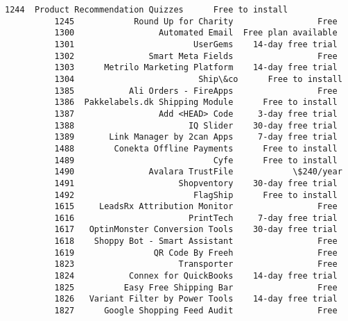 \documentclass[11pt]{article}
\begin{document}
\begin{Verbatim}[commandchars=\\\{\}]
          1244  Product Recommendation Quizzes      Free to install   
          1245            Round Up for Charity                 Free   
          1300                 Automated Email  Free plan available   
          1301                        UserGems    14-day free trial   
          1302               Smart Meta Fields                 Free   
          1303      Metrilo Marketing Platform    14-day free trial   
          1304                         Ship\&co      Free to install   
          1385           Ali Orders - FireApps                 Free   
          1386  Pakkelabels.dk Shipping Module      Free to install   
          1387                 Add <HEAD> Code     3-day free trial   
          1388                       IQ Slider    30-day free trial   
          1389       Link Manager by 2can Apps     7-day free trial   
          1488        Conekta Offline Payments      Free to install   
          1489                            Cyfe      Free to install   
          1490               Avalara TrustFile            \$240/year   
          1491                     Shopventory    30-day free trial   
          1492                        FlagShip      Free to install   
          1615     LeadsRx Attribution Monitor                 Free   
          1616                       PrintTech     7-day free trial   
          1617   OptinMonster Conversion Tools    30-day free trial   
          1618    Shoppy Bot - Smart Assistant                 Free   
          1619                QR Code By Freeh                 Free   
          1823                     Transporter                 Free   
          1824           Connex for QuickBooks    14-day free trial   
          1825          Easy Free Shipping Bar                 Free   
          1826   Variant Filter by Power Tools    14-day free trial   
          1827      Google Shopping Feed Audit                 Free   
          

\end{Verbatim}
\end{document}
